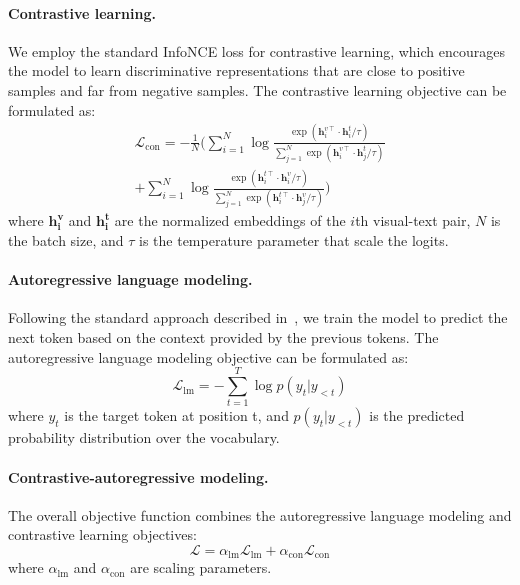 \paragraph{Contrastive learning.}
We employ the standard InfoNCE loss for contrastive learning, which encourages the model to learn discriminative representations that are close to positive samples and far from negative samples. 
%
The contrastive learning objective can be formulated as:
%
\begin{equation}
\begin{split}
    \mathcal{L}_{\text{con}} = - \frac{1}{N} (
    \sum_{i=1}^{N} \log \frac{\exp(\mathbf{h}_i^{v\intercal} \cdot \mathbf{h}_i^t / \tau)}{\sum_{j=1}^{N} \exp(\mathbf{h}_i^{v\intercal} \cdot \mathbf{h}_j^t / \tau)} \\ 
    + \sum_{i=1}^{N} \log \frac{\exp(\mathbf{h}_i^{t\intercal} \cdot \mathbf{h}_i^v / \tau)}{\sum_{j=1}^{N} \exp(\mathbf{h}_i^{t\intercal} \cdot \mathbf{h}_j^v / \tau)} 
    )
\end{split}
\label{eq:con}
\end{equation}
%
where $\mathbf{h_i^v}$ and $\mathbf{h_i^t}$ are the normalized embeddings of the $i$th visual-text pair, $N$ is the batch size, and $\tau$ is the temperature parameter that scale the logits. 
%

\paragraph{Autoregressive language modeling.} 
Following the standard approach described in~\citep{radford2018improving}, we train the model to predict the next token based on the context provided by the previous tokens. 
%
The autoregressive language modeling objective can be formulated as:
%
\begin{equation}
\mathcal{L}_{\text{lm}} = - \sum_{t=1}^{T} \log p(y_t | y_{<t})
\end{equation}
%
where $y_t$ is the target token at position t, and $p(y_t | y_{<t})$ is the predicted probability distribution over the vocabulary.
%

\paragraph{Contrastive-autoregressive modeling.} 
The overall objective function combines the autoregressive language modeling and contrastive learning objectives:
%
\begin{equation}
\mathcal{L} = \alpha_{\text{lm}} \mathcal{L}_{\text{lm}} + \alpha_{\text{con}} \mathcal{L}_{\text{con}} \label{eq:comb_loss}
\end{equation}
%
where $\alpha_{\text{lm}}$ and $\alpha_{\text{con}}$ are scaling parameters.
%

